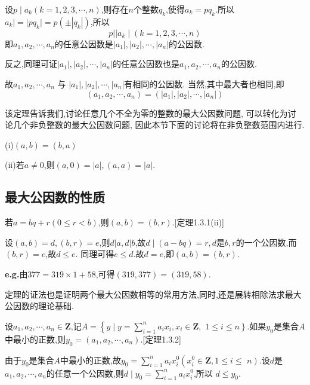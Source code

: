 \proof 设$p \mid a_{k}(k=1,2,3, \cdots, n)$,则存在$n$个整数$q_{k}$,使得$a_{k}=p q_{k}$.所以$a_{k}|=| p q_{k} \mid=p\left(\pm\left|q_{k}\right|\right)$,所以
\begin{equation*}
	p|| a_{k} \mid(k=1,2,3, \cdots, n)
\end{equation*}
即$a_{1}, a_{2}, \cdots, a_{n}$的任意公因数是$\left|a_{1}\right|,\left|a_{2}\right|, \cdots,\left|a_{n}\right|$的公因数.

反之,同理可证$\left|a_{1}\right|,\left|a_{2}\right|, \cdots,\left|a_{n}\right|$的任意公因数也是$a_{1}, a_{2}, \cdots, a_{n}$的公因数.

故$a_{1}, a_{2}, \cdots, a_{n}$ 与 $\left|a_{1}\right|,\left|a_{2}\right|, \cdots,\left|a_{n}\right|$有相同的公因数. 当然,其中最大者也相同,即
\begin{equation*}
	\left(a_{1}, a_{2}, \cdots, a_{n}\right)=\left(\left|a_{1}\right|,\left|a_{2}\right|, \cdots,\left|a_{n}\right|\right)
\end{equation*}

\remark 该定理告诉我们,讨论任意几个不全为零的整数的最大公因数问题, 可以转化为讨 论几个非负整数的最大公因数问题, 因此本节下面的讨论将在非负整数范围内进行.

\theorem (i)$(a, b)=(b, a)$

(ii)若$a \neq 0$,则$(a, 0)=|a|,(a, a)=|a|$.

\subsection{最大公因数的性质}
\theorem 若$a=b q+r(0 \leqslant r<b)$,则$(a, b)=(b, r)$.{\color{red}[定理1.3.1(ii)]}

\proof 设$(a, b)=d,(b, r)=e$,则$d|a, d| b$,故$d \mid(a-b q)=r, d$是$b, r$的一个公因数,而$(b, r)=e$,故$d \leqslant e$.
同理可得$e \leqslant d$.故$d=e$,即$(a, b)=(b, r)$.

\entry \textbf{e.g.}由$377=319 \times 1+58$,可得$(319,377)=(319,58)$.

\remark 定理的证法也是证明两个最大公因数相等的常用方法,同时,还是展转相除法求最大公因数的理论基础.

\theorem 设$a_{1}, a_{2}, \cdots, a_{n} \in \mathbf{Z}$,记$A=\left\{y \mid y=\displaystyle{\sum_{i=1}^{n} }a_{i} x_{i}, x_{i} \in \mathbf{Z},\right.$ $\left. 1 \leqslant i \leqslant n\right\}$.如果$y_{0}$是集合$A$中最小的正数,则$y_{0}=\left(a_{1}, a_{2}, \cdots, a_{n}\right)$.{\color{red}[定理1.3.2]}

\proof 由于$y_{0}$是集合$A$中最小的正数,故$y_{0}=\displaystyle{\sum_{i=1}^{n}} a_{i} x_{i}^{0}\left(x_{i}^{0} \in \mathbf{Z}, 1 \leqslant i \leqslant\right.$ $\left. n\right)$.设$d$是$a_{1}, a_{2}, \cdots, a_{n}$的任意一个公因数,则$d \mid y_{0}=\displaystyle{\sum_{i=1}^{n}} a_{i} x_{i}^{0}$,所以 $d \leqslant y_{0}$.


